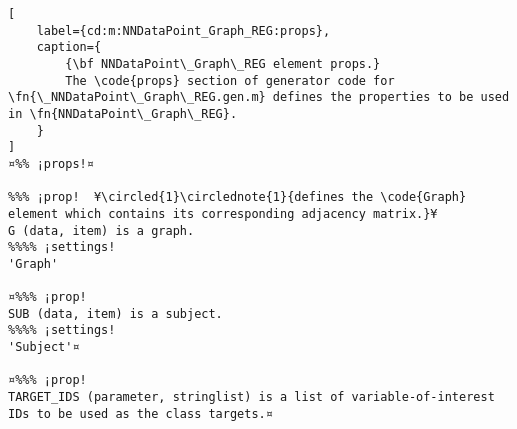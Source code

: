 \documentclass{tufte-handout}
\begin{document}
\begin{lstlisting}[
	label={cd:m:NNDataPoint_Graph_REG:props},
	caption={
		{\bf NNDataPoint\_Graph\_REG element props.}
		The \code{props} section of generator code for \fn{\_NNDataPoint\_Graph\_REG.gen.m} defines the properties to be used in \fn{NNDataPoint\_Graph\_REG}.
	}
]
¤%% ¡props!¤

%%% ¡prop!  ¥\circled{1}\circlednote{1}{defines the \code{Graph} element which contains its corresponding adjacency matrix.}¥
G (data, item) is a graph.
%%%% ¡settings!
'Graph'

¤%%% ¡prop!
SUB (data, item) is a subject.
%%%% ¡settings!
'Subject'¤

¤%%% ¡prop!
TARGET_IDS (parameter, stringlist) is a list of variable-of-interest IDs to be used as the class targets.¤

\end{lstlisting}

\clearpage
\end{document}
